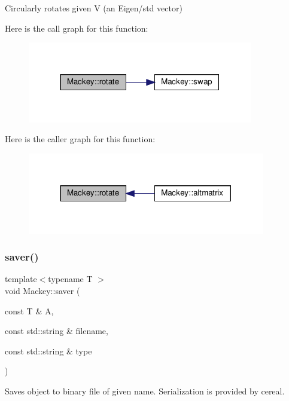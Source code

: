 Circularly rotates given V (an Eigen/std vector) 

Here is the call graph for this function\+:\nopagebreak
\begin{figure}[H]
\begin{center}
\leavevmode
\includegraphics[width=278pt]{namespaceMackey_a38a833de54971845cbdb8c96f830725b_cgraph}
\end{center}
\end{figure}
Here is the caller graph for this function\+:\nopagebreak
\begin{figure}[H]
\begin{center}
\leavevmode
\includegraphics[width=293pt]{namespaceMackey_a38a833de54971845cbdb8c96f830725b_icgraph}
\end{center}
\end{figure}
\mbox{\label{namespaceMackey_a1824d780ce15f1845e4f87bf056feec9}} 
\subsubsection{\texorpdfstring{saver()}{saver()}}
{\footnotesize\ttfamily template$<$typename T $>$ \\
void Mackey\+::saver (\begin{DoxyParamCaption}\item[{const T \&}]{A,  }\item[{const std\+::string \&}]{filename,  }\item[{const std\+::string \&}]{type }\end{DoxyParamCaption})}



Saves object to binary file of given name. Serialization is provided by cereal. 


